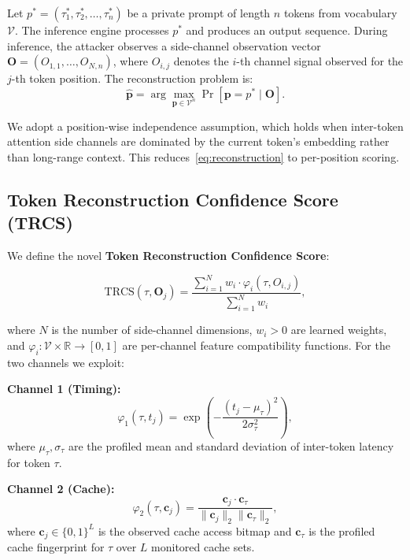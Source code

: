 \documentclass[journal,10pt,twocolumn]{IEEEtran}
\begin{document}
Let $p^* = (\tau_1^*, \tau_2^*, \ldots, \tau_n^*)$ be a private
prompt of length $n$ tokens from vocabulary $\mathcal{V}$.
The inference engine processes $p^*$ and produces an output
sequence. During inference, the attacker observes a
side-channel observation vector
$\mathbf{O} = (O_{1,1}, \ldots, O_{N,n})$, where $O_{i,j}$
denotes the $i$-th channel signal observed for the $j$-th
token position. The reconstruction problem is:
\begin{equation}
  \hat{\mathbf{p}} = \arg\max_{\mathbf{p} \in \mathcal{V}^n}
  \Pr\!\left[\mathbf{p} = p^* \mid \mathbf{O}\right].
  \label{eq:reconstruction}
\end{equation}

We adopt a position-wise independence assumption, which holds
when inter-token attention side channels are dominated by
the current token's embedding rather than long-range context.
This reduces~\eqref{eq:reconstruction} to per-position scoring.

\subsection{Token Reconstruction Confidence Score (TRCS)}

We define the novel \textbf{Token Reconstruction Confidence Score}:

\begin{equation}
  \mathrm{TRCS}(\tau, \mathbf{O}_j)
  = \frac{\sum_{i=1}^{N} w_i \cdot \varphi_i(\tau, O_{i,j})}
         {\sum_{i=1}^{N} w_i},
  \label{eq:trcs}
\end{equation}

where $N$ is the number of side-channel dimensions, $w_i > 0$
are learned weights, and $\varphi_i : \mathcal{V} \times
\mathbb{R} \to [0,1]$ are per-channel feature compatibility
functions. For the two channels we exploit:

\textbf{Channel 1 (Timing):}
\begin{equation}
  \varphi_1(\tau, t_j) = \exp\!\left(
    -\frac{(t_j - \mu_\tau)^2}{2\sigma_\tau^2}
  \right),
  \label{eq:phi1}
\end{equation}
where $\mu_\tau, \sigma_\tau$ are the profiled mean and standard
deviation of inter-token latency for token $\tau$.

\textbf{Channel 2 (Cache):}
\begin{equation}
  \varphi_2(\tau, \mathbf{c}_j) =
  \frac{\mathbf{c}_j \cdot \mathbf{c}_\tau}
       {\|\mathbf{c}_j\|_2 \|\mathbf{c}_\tau\|_2},
  \label{eq:phi2}
\end{equation}
where $\mathbf{c}_j \in \{0,1\}^L$ is the observed cache
access bitmap and $\mathbf{c}_\tau$ is the profiled cache
fingerprint for $\tau$ over $L$ monitored cache sets.
\end{document}
